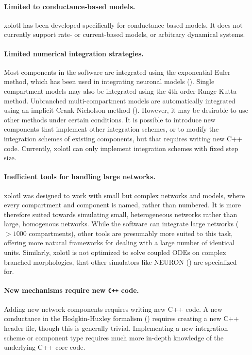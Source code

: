 \documentclass{frontiersSCNS} %
\begin{document}
\paragraph{Limited to conductance-based models.} xolotl has been developed specifically for conductance-based models. It does not currently support rate- or current-based models, or arbitrary dynamical systems.

\begin{tcolorbox}[breakable,notitle,boxrule=0pt,colback=yellow,colframe=yellow]

\paragraph{Limited numerical integration strategies.} Most components in the software are integrated using the exponential Euler method, which has been used in integrating neuronal models (\cite{ohErrorAnalysisSpecialized2006, dayanTheoreticalNeuroscience2001}). Single compartment models may also be integrated using the 4th order Runge-Kutta method. Unbranched multi-compartment models are automatically integrated using an implicit Crank-Nicholson method (\cite{dayanTheoreticalNeuroscience2001}). However, it may be desirable to use other methods under certain conditions. It is possible to introduce new components that implement other integration schemes, or to modify the integration schemes of existing components, but that requires writing new C++  code. Currently, xolotl can only implement integration schemes with fixed step size.
\end{tcolorbox}


\paragraph{Inefficient tools for handling large networks.} xolotl was designed to work with small but complex networks and models, where every compartment and component is named, rather than numbered. It is more therefore suited towards simulating small, heterogeneous networks rather than large, homogenous networks. While the software can integrate large networks ($>1000$ compartments), other tools are presumably more suited to this task, offering more natural frameworks for dealing with a large number of identical units. Similarly, xolotl is not optimized to solve coupled ODEs on complex branched morphologies, that other simulators like NEURON (\cite{hinesNEURONSimulationEnvironment1997}) are specialized for.

\paragraph{New mechanisms require new \texttt{C++} code.} Adding new network components requires writing new C++ code. A new conductance in the Hodgkin-Huxley formalism (\cite{hodgkinComponentsMembraneConductance1952, hodgkinMeasurementCurrentvoltageRelations1952, hodgkinQuantitativeDescriptionMembrane1952, dayanTheoreticalNeuroscience2001}) requires creating a new C++ header file, though this is generally trivial. Implementing a new integration scheme or component type requires much more in-depth knowledge of the underlying C++ core code.
\end{document}
